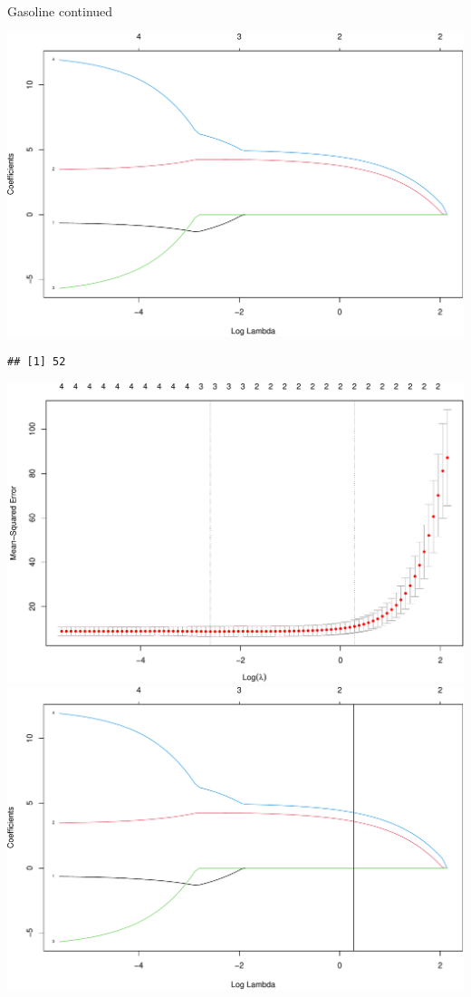 \documentclass[
  ignorenonframetext,
]{beamer}
\begin{document}
\begin{frame}[fragile]

\begin{block}{Gasoline continued}

\includegraphics{L2_files/figure-beamer/unnamed-chunk-13-1.pdf}

\begin{verbatim}
## [1] 52
\end{verbatim}

\includegraphics{L2_files/figure-beamer/unnamed-chunk-13-2.pdf}
\includegraphics{L2_files/figure-beamer/unnamed-chunk-13-3.pdf}


\end{block}
\end{frame}
\end{document}
